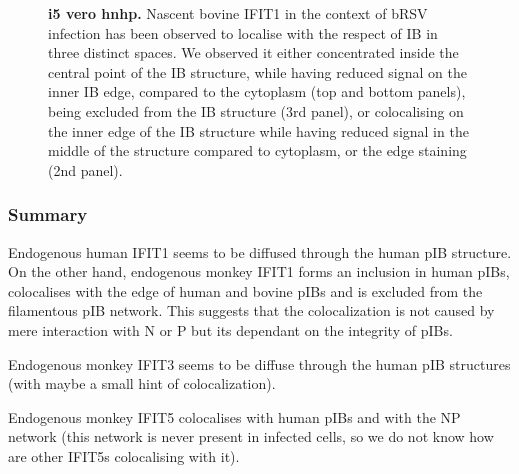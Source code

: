 \begin{figure}
\begin{subfigure}{1\textwidth}
    \end{subfigure}
    \caption[i5 vero hnhp]{\textbf{i5 vero hnhp.} Nascent bovine IFIT1 in the context of bRSV infection has been observed to localise with the respect of IB in three distinct spaces. We observed it either concentrated inside the central point of the IB structure, while having reduced signal on the inner IB edge, compared to the cytoplasm (top and bottom panels), being excluded from the IB structure (3rd panel), or colocalising on the inner edge of the IB structure while having reduced signal in the middle of the structure compared to cytoplasm, or the edge staining (2nd panel).}
    \label{fig:i5 vero hnhp}
\end{figure}

\subsubsection{Summary} \label{Summary-pib}
Endogenous human IFIT1 seems to be diffused through the human pIB structure. On the other hand, endogenous monkey IFIT1 forms an inclusion in human pIBs, colocalises with the edge of human and bovine pIBs and is excluded from the filamentous pIB network. This suggests that the colocalization is not caused by mere interaction with N or P but its dependant on the integrity of pIBs.

Endogenous monkey IFIT3 seems to be diffuse through the human pIB structures (with maybe a small hint of colocalization).

Endogenous monkey IFIT5 colocalises with human pIBs and with the NP network (this network is never present in infected cells, so we do not know how are other IFIT5s colocalising with it).